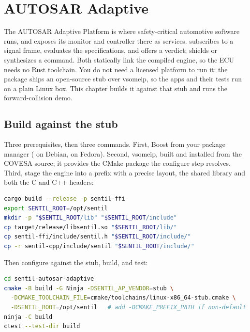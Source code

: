 \chapter{AUTOSAR Adaptive}
\label{ch:autosar}

The AUTOSAR Adaptive Platform is where safety-critical automotive software runs, and \sentil{} exposes its monitor and controller there as  services.  subscribes to a signal frame, evaluates the specifications, and offers a verdict;  shields or synthesizes a command. Both statically link the compiled engine, so the ECU needs no Rust toolchain. You do not need a licensed platform to run it: the package ships an open-source  stub over vsomeip, so the apps and their tests run on a plain Linux box. This chapter builds it against that stub and runs the forward-collision demo.

\section{Build against the stub}

Three prerequisites, then three commands. First, Boost from your package manager ( on Debian,  on Fedora). Second, vsomeip, built and installed from the COVESA source; it provides the  CMake package the configure step resolves. Third, stage the engine into a  prefix with a precise layout, the shared library and both the C and C++ headers:

\begin{lstlisting}[language=bash]
cargo build --release -p sentil-ffi
export SENTIL_ROOT=/opt/sentil
mkdir -p "$SENTIL_ROOT/lib" "$SENTIL_ROOT/include"
cp target/release/libsentil.so "$SENTIL_ROOT/lib/"
cp sentil-ffi/include/sentil.h "$SENTIL_ROOT/include/"
cp -r sentil-cpp/include/sentil "$SENTIL_ROOT/include/"
\end{lstlisting}

Then configure against the stub, build, and test:

\begin{lstlisting}[language=bash]
cd sentil-autosar-adaptive
cmake -B build -G Ninja -DSENTIL_AP_VENDOR=stub \
  -DCMAKE_TOOLCHAIN_FILE=cmake/toolchains/linux-x86_64-stub.cmake \
  -DSENTIL_ROOT=/opt/sentil   # add -DCMAKE_PREFIX_PATH if non-default
ninja -C build
ctest --test-dir build
\end{lstlisting}

